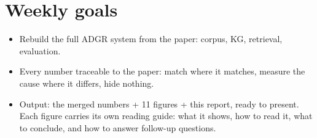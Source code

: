 \documentclass[12pt,a4paper]{article}
\begin{document}
\section{Weekly goals}
\begin{itemize}[leftmargin=*]
\item Rebuild the full ADGR system from the paper: corpus, KG, retrieval,
evaluation.
\item Every number traceable to the paper: match where it matches, measure
the cause where it differs, hide nothing.
\item Output: the merged numbers + 11 figures + this report, ready to present.
Each figure carries its own reading guide: what it shows, how to read it,
what to conclude, and how to answer follow-up questions.
\end{itemize}

\end{document}
